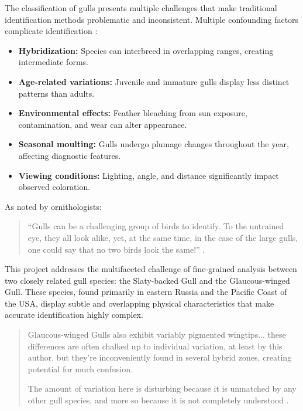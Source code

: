 \documentclass[a4paper,12pt]{report}
\begin{document}
The classification of gulls presents multiple challenges that make traditional identification methods problematic and inconsistent.
Multiple confounding factors complicate identification \citep{adriaens2022}:
\begin{itemize}
    \item \textbf{Hybridization:} Species can interbreed in overlapping ranges, creating intermediate forms.
    \item \textbf{Age-related variations:} Juvenile and immature gulls display less distinct patterns than adults.
    \item \textbf{Environmental effects:} Feather bleaching from sun exposure, contamination, and wear can alter appearance.
    \item \textbf{Seasonal moulting:} Gulls undergo plumage changes throughout the year, affecting diagnostic features.
    \item \textbf{Viewing conditions:} Lighting, angle, and distance significantly impact observed coloration.
\end{itemize} 

As noted by ornithologists:

\begin{quote}
    ``Gulls can be a challenging group of birds to identify. To the untrained eye, they all look alike, yet, at the same time, in the case of the large gulls, one could say that no two birds look the same!'' \citep{ayyash2024}.
\end{quote}

This project addresses the multifaceted challenge of fine-grained analysis between two closely related gull species: the Slaty-backed Gull and the Glaucous-winged Gull. These species, found primarily in eastern Russia and the Pacific Coast of the USA, display subtle and overlapping physical characteristics that make accurate identification highly complex.

\begin{quote}
    Glaucous-winged Gulls also exhibit variably pigmented wingtips... these differences are often chalked up to individual
    variation, at least by this author, but they're inconveniently found in several hybrid zones, creating potential for much
    confusion.
    
    The amount of variation here is disturbing because it is unmatched by any other gull species, and more so because it is not completely understood \citep{adriaens2022gulls}.
\end{quote}
\end{document}
